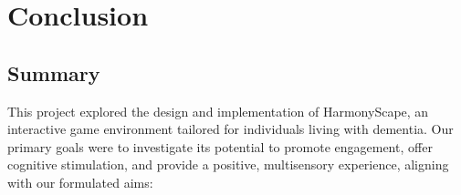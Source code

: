 \documentclass{l4proj}
\begin{document}





\chapter{Conclusion}    

\section{Summary}
This project explored the design and implementation of HarmonyScape, an interactive game environment tailored for individuals living with dementia. Our primary goals were to investigate its potential to promote engagement, offer cognitive stimulation, and provide a positive, multisensory experience, aligning with our formulated aims:
\end{document}
